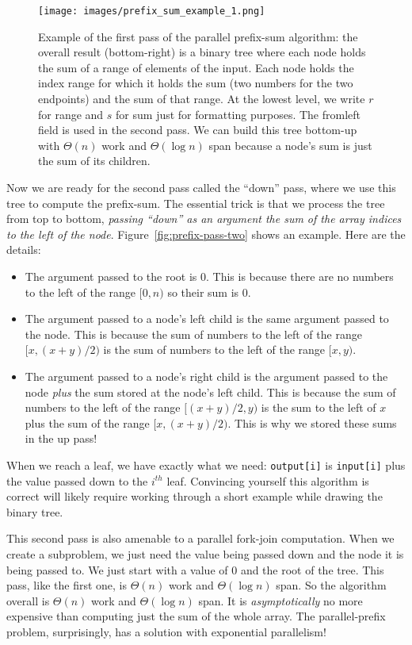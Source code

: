 \documentclass[10pt]{article}
\begin{document}
\begin{figure}
\begin{center}
\texttt{[image: images/prefix\_sum\_example\_1.png]}
\end{center}
\caption{Example of the first pass of the parallel prefix-sum
  algorithm: the overall result (bottom-right) is a binary tree where
  each node holds the sum of a range of elements of the input.  Each
  node holds the index range for which it holds the sum (two numbers
  for the two endpoints) and the sum of that range.  At the lowest
  level, we write $r$ for range and $s$ for sum just for formatting
  purposes.  The fromleft field is used in the second pass.  We can
  build this tree bottom-up with $\Theta(n)$ work and $\Theta(\log n)$
  span because a node's sum is just the sum of its children.}
\label{fig:prefix-pass-one}
\end{figure}

Now we are ready for the second pass called the ``down'' pass, where
we use this tree to compute the prefix-sum.  The essential trick is
that we process the tree from top to bottom, \emph{passing ``down'' as
  an argument the sum of the array indices to the left of the node}.
Figure~\ref{fig:prefix-pass-two} shows an example.  Here are the details:
\begin{itemize}
\item The argument passed to the root is 0.  This is because there are no
  numbers to the left of the range $[0,n)$ so their sum is 0.
\item The argument passed to a node's left child is the same argument
  passed to the node.  This is because the sum of numbers to the left
  of the range $[x,(x+y)/2)$ is the sum of numbers to the left of
  the range $[x,y)$.  
\item The argument passed to a node's right child is the argument
  passed to the node \emph{plus} the sum stored at the node's left child.
  This is because the sum of numbers to the left of the range
  $[(x+y)/2, y)$ is the sum to the left of $x$ plus the sum of the
  range $[x, (x+y)/2)$.  This is why we stored these sums in the up pass!
\end{itemize}
When we reach a leaf, we have exactly what we need: {\tt output[i]}
is {\tt input[i]} plus the value passed down to the $i^{th}$ leaf.
Convincing yourself this algorithm is correct will likely require
working through a short example while drawing the binary tree.

This second pass is also amenable to a parallel fork-join computation.
When we create a subproblem, we just need the value being passed down
and the node it is being passed to.  We just start with a value of 0
and the root of the tree.  This pass, like the first one, is
$\Theta(n)$ work and $\Theta(\log n)$ span.  So the algorithm overall
is $\Theta(n)$ work and $\Theta(\log n)$ span.  It is
\emph{asymptotically} no more expensive than computing just the sum of
the whole array.  The parallel-prefix problem, surprisingly, has a
solution with exponential parallelism!
\end{document}
